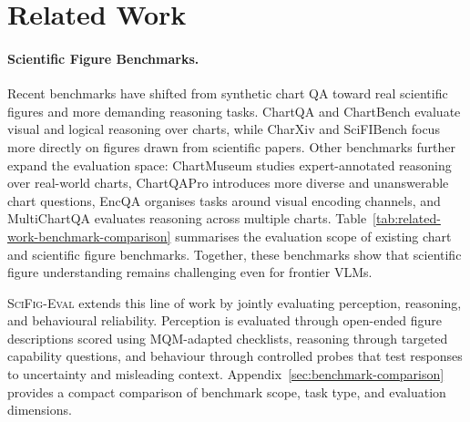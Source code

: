 \section{Related Work}
\label{sec:related_work}

\paragraph{Scientific Figure Benchmarks.}
Recent benchmarks have shifted from synthetic chart QA toward real scientific figures and more demanding reasoning tasks. ChartQA and ChartBench evaluate visual and logical reasoning over charts, while CharXiv and SciFIBench focus more directly on figures drawn from scientific papers. Other benchmarks further expand the evaluation space: ChartMuseum studies expert-annotated reasoning over real-world charts, ChartQAPro introduces more diverse and unanswerable chart questions, EncQA organises tasks around visual encoding channels, and MultiChartQA evaluates reasoning across multiple charts. Table~\ref{tab:related-work-benchmark-comparison} summarises the evaluation scope of existing chart and scientific figure benchmarks. Together, these benchmarks show that scientific figure understanding remains challenging even for frontier VLMs.

\textsc{SciFig-Eval} extends this line of work by jointly evaluating perception, reasoning, and behavioural reliability. Perception is evaluated through open-ended figure descriptions scored using MQM-adapted checklists, reasoning through targeted capability questions, and behaviour through controlled probes that test responses to uncertainty and misleading context. Appendix~\ref{sec:benchmark-comparison} provides a compact comparison of benchmark scope, task type, and evaluation dimensions.



